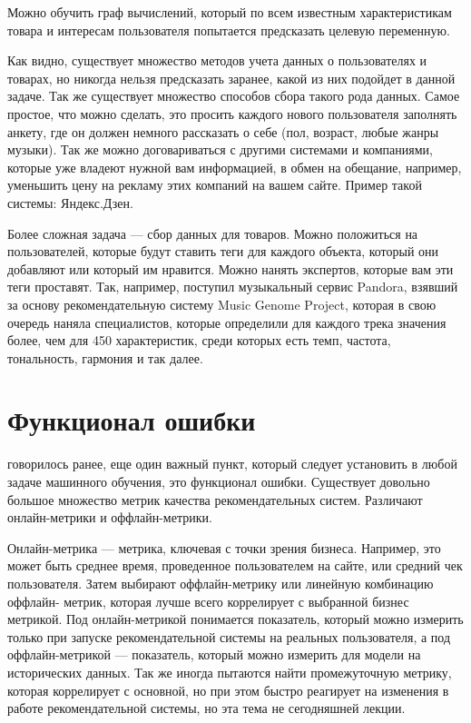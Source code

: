 \documentclass{article}
\newcommand\tab[1][1cm]{\hspace*{#1}}
\begin{document}
Можно обучить граф вычислений, который по всем известным характеристикам товара и интересам пользователя попытается предсказать целевую переменную.

Как видно, существует множество методов учета данных о пользователях и товарах, но никогда нельзя предсказать заранее, какой из них подойдет в данной задаче. Так же существует множество способов сбора такого рода данных. Самое простое, что можно сделать, это просить каждого нового пользователя заполнять анкету, где он должен немного рассказать о себе (пол, возраст, любые жанры музыки). Так же можно договариваться с другими системами и компаниями, которые уже владеют нужной вам информацией, в обмен на обещание, например, уменьшить цену на рекламу этих компаний на вашем сайте. Пример такой системы: Яндекс.Дзен.


Более сложная задача — сбор данных для товаров. Можно положиться на пользователей, которые будут ставить теги для каждого объекта, который они добавляют или который им нравится. Можно нанять экспертов, которые вам эти теги проставят. Так, например, поступил музыкальный сервис Pandora, взявший за основу рекомендательную систему Music Genome Project, которая в свою очередь наняла специалистов, которые определили для каждого трека значения более, чем для 450 характеристик, среди которых есть темп, частота, тональность, гармония и так далее.
\section{Функционал ошибки}
 говорилось ранее, еще один важный пункт, который следует установить в любой задаче машинного обучения, это функционал ошибки. Существует довольно большое множество метрик качества рекомендательных систем. Различают онлайн-метрики и оффлайн-метрики.

Онлайн-метрика — метрика, ключевая с точки зрения бизнеса. Например, это может быть среднее время, проведенное пользователем на сайте, или средний чек пользователя. Затем выбирают оффлайн-метрику или линейную комбинацию оффлайн- метрик, которая лучше всего коррелирует с выбранной бизнес метрикой. Под онлайн-метрикой понимается показатель, который можно измерить только при запуске рекомендательной системы на реальных пользователя, а под оффлайн-метрикой — показатель, который можно измерить для модели на исторических данных. Так же иногда пытаются найти промежуточную метрику, которая коррелирует с основной, но при этом быстро реагирует на изменения в работе рекомендательной системы, но эта тема не сегодняшней лекции.\\
\end{document}
